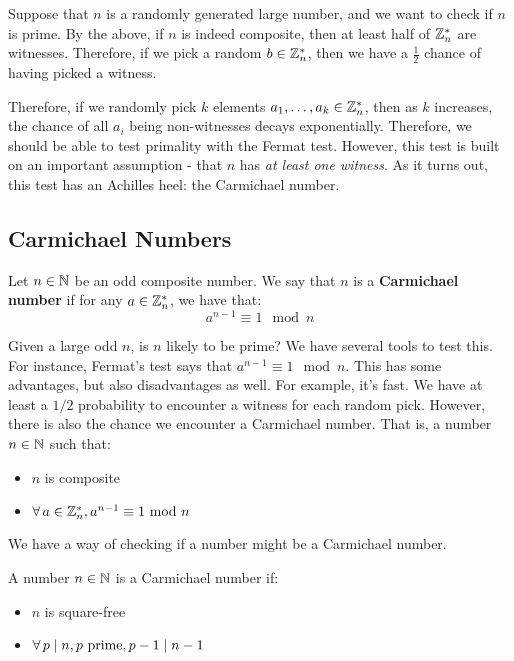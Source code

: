 \documentclass{article}
\begin{document}
Suppose that $ n $ is a randomly generated large number, and we want to check if $ n $ is prime.
By the above, if $ n $ is indeed composite, then at least half of $ \mathbb{Z}_{n}^{*} $ are witnesses.
Therefore, if we pick a random $ b \in \mathbb{Z}_{n}^{*} $, then we have a $ \frac{1}{2} $ chance of
having picked a witness.

Therefore, if we randomly pick $ k $ elements $ a_{1}, \dots, a_{k} \in \mathbb{Z}_{n}^{*} $, then
as $ k $ increases, the chance of all $ a_{i} $ being non-witnesses decays exponentially.
Therefore, we should be able to test primality with the Fermat test.
However, this test is built on an important assumption - that $ n $ has
\textit{at least one witness}.
As it turns out, this test has an Achilles heel: the Carmichael number.

\subsection{Carmichael Numbers}

\begin{defn}
    Let $ n \in \mathbb{N} $ be an odd composite number.
    We say that $ n $ is a \textbf{Carmichael number} if for any $ a \in \mathbb{Z}_{n}^{*} $, we
    have that:
    \begin{equation*}
        a^{n-1} \equiv 1 \mod n
    \end{equation*}
\end{defn}


Given a large odd $ n $, is $ n $ likely to be prime? \vsp
%
We have several tools to test this.
For instance, Fermat's test says that $ a^{n-1} \equiv 1 \mod n $.
This has some advantages, but also disadvantages as well. \vsp
%
For example, it's fast.
We have at least a $ 1/2 $ probability to encounter a witness for each random pick.
However, there is also the chance we encounter a Carmichael number.
That is, a number $ n \in \mathbb{N} $ such that:
\begin{itemize}
    \item $ n $ is composite
    \item $ \forall \, a \in \mathbb{Z}_{n}^{*}, a^{n-1} \equiv 1 \ \mathrm{mod}\ n $
\end{itemize}

We have a way of checking if a number might be a Carmichael number.

\begin{lm}[title=Korselt's Criterion]
    A number $ n \in \mathbb{N} $ is a Carmichael number if:
    \begin{itemize}
        \item $ n $ is square-free
        \item $ \forall \, p \mid n, p \textrm{ prime}, p - 1 \mid n - 1 $
    \end{itemize}
\end{lm}
\end{document}
